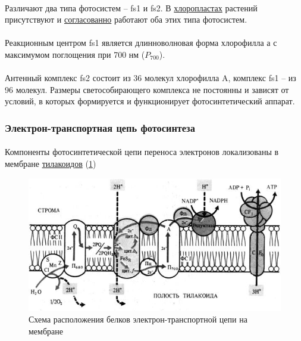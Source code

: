 \paragraph*{}Различают два типа фотосистем -- \gls{fs1} и \gls{fs2}. В \hyperlink{cell_plastids}{хлоропластах} растений присутствуют и \hyperlink{photocooperation}{согласованно} работают оба этих типа фотосистем.


\paragraph*{}Реакционным центром \gls{fs1} является длинноволновая форма хлорофилла а с максимумом поглощения при 700 нм ($P_{700}$). 

\paragraph*{}Антенный комплекс \gls{fs2} состоит из 36 молекул хлорофилла A, комплекс \gls{fs1} -- из 96 молекул. Размеры светособирающего комплекса не постоянны и зависят от условий, в которых формируется и функционирует фотосинтетический аппарат.


\subsubsection*{Электрон-транспортная цепь фотосинтеза}

\paragraph*{}Компоненты \hypertarget{photoetl}{фотосинтетической цепи} переноса электронов локализованы в мембране \hyperlink{cell_plastids}{тилакоидов} (\ris \ref{etl})

\begin{figure}
  \centering
       \includegraphics[width=0.8\linewidth]{pictures/etl}
\caption{Схема расположения белков электрон-транспортной цепи на мембране}
\label{etl}
\end{figure}

